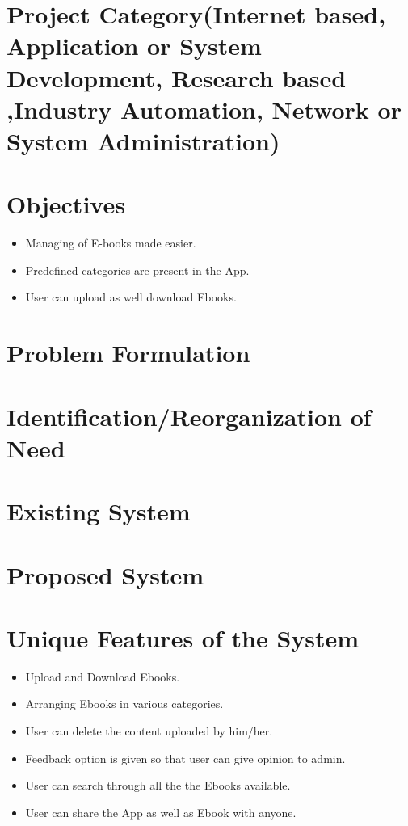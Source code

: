 \section{Project Category(Internet based, Application or System Development, Research based ,Industry Automation, Network or System Administration)}

\section{Objectives}

\begin{itemize}
	\item Managing of E-books made easier.

	\item Predefined categories are present in the App.
	
	\item User can upload as well download Ebooks.


\end{itemize}

\section{Problem Formulation}

\section{Identification/Reorganization of Need}

\section{Existing System}

\section{Proposed System}

\section{Unique Features of the System}
\begin{itemize}

\item Upload and Download Ebooks.
\item Arranging Ebooks in various categories.
\item User can delete the content uploaded by him/her.
\item Feedback option is given so that user can give opinion to admin.
\item User can search through all the the Ebooks available.
\item User can share the App as well as Ebook with anyone. 
\end{itemize}


